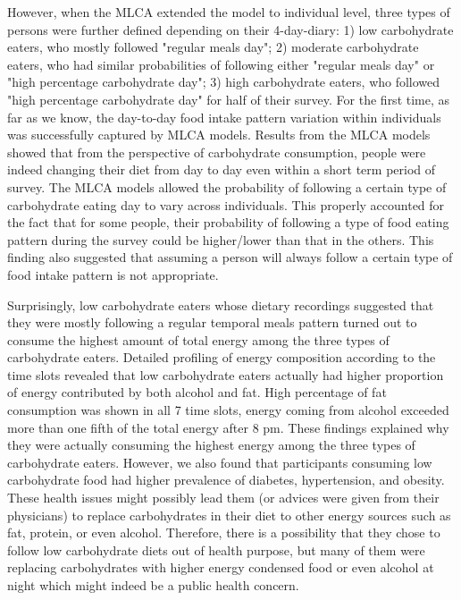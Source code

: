 However, when the MLCA extended the model to individual level, three types of persons were further defined depending on their 4-day-diary: 1) low carbohydrate eaters, who mostly followed "regular meals day"; 2) moderate carbohydrate eaters, who had similar probabilities of following either "regular meals day" or "high percentage carbohydrate day"; 3) high carbohydrate eaters, who followed "high percentage carbohydrate day" for half of their survey. For the first time, as far as we know, the day-to-day food intake pattern variation within individuals was successfully captured by MLCA models. Results from the MLCA models showed that from the perspective of carbohydrate consumption, people were indeed changing their diet from day to day even within a short term period of survey. The MLCA models allowed the probability of following a certain type of carbohydrate eating day to vary across individuals. This properly accounted for the fact that for some people, their probability of following a type of food eating pattern during the survey could be higher/lower than that in the others. This finding also suggested that assuming a person will always follow a certain type of food intake pattern is not appropriate.

Surprisingly, low carbohydrate eaters whose dietary recordings suggested that they were mostly following a regular temporal meals pattern turned out to consume the highest amount of total energy among the three types of carbohydrate eaters. Detailed profiling of energy composition according to the time slots revealed that low carbohydrate eaters actually had higher proportion of energy contributed by both alcohol and fat. High percentage of fat consumption was shown in all 7 time slots, energy coming from alcohol exceeded more than one fifth of the total energy after 8 pm. These findings explained why they were actually consuming the highest energy among the three types of carbohydrate eaters. However, we also found that participants consuming low carbohydrate food had higher prevalence of diabetes, hypertension, and obesity. These health issues might possibly lead them (or advices were given from their physicians) to replace carbohydrates in their diet to other energy sources such as fat, protein, or even alcohol. Therefore, there is a possibility that they chose to follow low carbohydrate diets out of health purpose, but many of them were replacing carbohydrates with higher energy condensed food or even alcohol at night which might indeed be a public health concern. 

